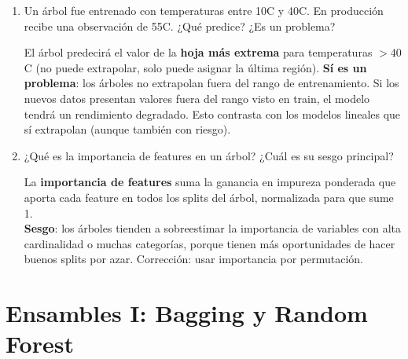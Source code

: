 \documentclass[11pt,a4paper]{article}
\begin{document}
\begin{enumerate}[label=\textbf{P\arabic*.}, resume]
\item Un \'arbol fue entrenado con temperaturas entre 10\textdegree C y 40\textdegree C.
  En producci\'on recibe una observaci\'on de 55\textdegree C. ¿Qu\'e predice? ¿Es un
  problema?

\begin{answerbox}
El \'arbol predecir\'a el valor de la \textbf{hoja m\'as extrema} para temperaturas
$> 40$\textdegree C (no puede extrapolar, solo puede asignar la \'ultima regi\'on).
\textbf{S\'i es un problema}: los \'arboles no extrapolan fuera del rango de
entrenamiento. Si los nuevos datos presentan valores fuera del rango visto en train, el
modelo tendr\'a un rendimiento degradado. Esto contrasta con los modelos lineales que
s\'i extrapolan (aunque tambi\'en con riesgo).
\end{answerbox}

\item ¿Qu\'e es la importancia de features en un \'arbol? ¿Cu\'al es su sesgo principal?

\begin{answerbox}
La \textbf{importancia de features} suma la ganancia en impureza ponderada que aporta
cada feature en todos los splits del \'arbol, normalizada para que sume 1.\\[4pt]
\textbf{Sesgo}: los \'arboles tienden a sobreestimar la importancia de variables con
alta cardinalidad o muchas categor\'ias, porque tienen m\'as oportunidades de hacer
buenos splits por azar. Correcci\'on: usar importancia por permutaci\'on.
\end{answerbox}

\end{enumerate}

\section{Ensambles I: Bagging y Random Forest}
\end{document}
